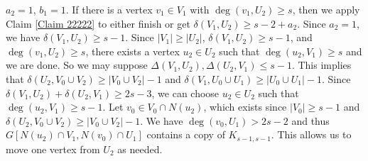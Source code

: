 \documentclass[oneside,12pt]{memoir}
\begin{document}
$a_2=1$, $b_1=1$.  If there is a vertex $v_1\in V_1$ with $\deg(v_1, U_2)\geq s$, then we apply Claim \ref{Claim 22222} to either finish or get $\delta(V_1, U_2)\geq s-2+a_2$. Since $a_2=1$, we have $\delta(V_1, U_2)\geq s-1$.  Since $|V_1|\geq |U_2|$, $\delta(V_1, U_2)\geq s-1$, and $\deg(v_1, U_2)\geq s$, there exists a vertex $u_2\in U_2$ such that $\deg(u_2, V_1)\geq s$ and we are done.  So we may suppose $\Delta(V_1, U_2),\Delta(U_2, V_1)\leq s-1$.  This implies that $\delta(U_2, V_0\cup V_2)\geq |V_0\cup V_2|-1$ and $\delta(V_1, U_0\cup U_1)\geq |U_0\cup U_1|-1$.  Since $\delta(V_1, U_2)+\delta(U_2, V_1)\geq 2s-3$, we can choose $u_2\in U_2$ such that $\deg(u_2, V_1)\geq s-1$.  Let $v_0\in V_0\cap N(u_2)$, which exists since $|V_0|\geq s-1$ and $\delta(U_2, V_0\cup V_2)\geq |V_0\cup V_2|-1$.  We have $\deg(v_0, U_1)>2s-2$ and thus $G[N(u_2)\cap V_1, N(v_0)\cap U_1]$ contains a copy of $K_{s-1,s-1}$.  This allows us to move one vertex from $U_2$ as needed.




\end{document}
